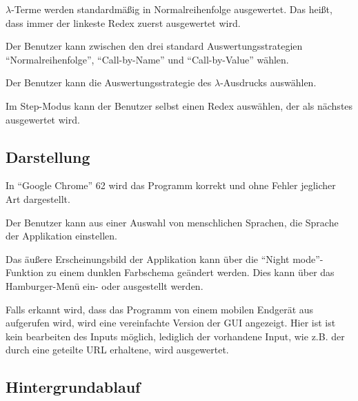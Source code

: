 \documentclass[parskip=full,11pt,twoside]{scrartcl}
\begin{document}
$\lambda$-Terme werden standardmäßig in Normalreihenfolge ausgewertet. Das heißt, dass immer der linkeste Redex zuerst ausgewertet wird.

Der Benutzer kann zwischen den drei standard Auswertungsstrategien \enquote{Normalreihenfolge}, \enquote{Call-by-Name} und \enquote{Call-by-Value} wählen.

Der Benutzer kann die Auswertungsstrategie des $\lambda$-Ausdrucks auswählen.

Im Step-Modus kann der Benutzer selbst einen Redex auswählen, der als nächstes ausgewertet wird.




\subsection{Darstellung}

In \enquote{Google Chrome} 62 wird das Programm korrekt und ohne Fehler jeglicher Art dargestellt.

Der Benutzer kann aus einer Auswahl von menschlichen Sprachen, die Sprache der Applikation einstellen.

Das äußere Erscheinungsbild der Applikation kann über die \enquote{Night mode}-Funktion zu einem dunklen Farbschema geändert werden. Dies kann über das Hamburger-Menü ein- oder ausgestellt werden.

Falls erkannt wird, dass das Programm von einem mobilen Endgerät aus aufgerufen wird, wird eine vereinfachte Version der GUI angezeigt. Hier ist ist kein bearbeiten des Inputs möglich, lediglich der vorhandene Input, wie z.B. der durch eine geteilte URL erhaltene, wird ausgewertet.




\subsection{Hintergrundablauf}
\end{document}
